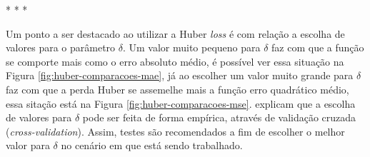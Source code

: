 \medskip
\begin{center}
 * * *
\end{center}
\medskip

Um ponto a ser destacado ao utilizar a Huber \textit{loss} é com relação a escolha de valores para o parâmetro $\delta$. Um valor muito pequeno para $\delta$ faz com que a função se comporte mais como o erro absoluto médio, é possível ver essa situação na Figura \ref{fig:huber-comparacoes-mae}, já ao escolher um valor muito grande para $\delta$ faz com que a perda Huber se assemelhe mais a função erro quadrático médio, essa sitação está na Figura \ref{fig:huber-comparacoes-mse}. \textcite{LossesArticle} explicam que a escolha de valores para $\delta$ pode ser feita de forma empírica, através de validação cruzada (\textit{cross-validation}). Assim, testes são recomendados a fim de escolher o melhor valor para $\delta$ no cenário em que está sendo trabalhado.

